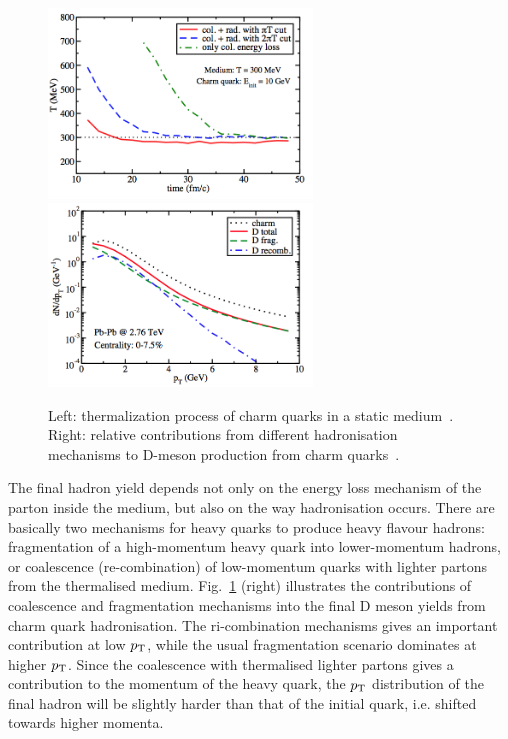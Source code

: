 \begin{figure}[!ht]
  \centering
  \includegraphics[width=7cm]{FigCap2/HFEnLoss3.png}
  \includegraphics[width=7cm]{FigCap2/FragHQ.png}
  \caption{Left: thermalization process of charm quarks in a static medium~\cite{Cao:2013ita}. Right: relative contributions from different hadronisation mechanisms to D-meson production from charm quarks~\cite{Cao:2013ita}.}
  \label{fig:HFEnLoss2}
\end{figure}
The final hadron yield depends not only on the energy loss mechanism of the parton inside the medium,
but also on the way hadronisation occurs. There are basically two mechanisms for heavy quarks 
to produce heavy flavour hadrons: fragmentation of a high-momentum heavy quark into lower-momentum
hadrons, or coalescence (re-combination) of low-momentum quarks with lighter partons from the thermalised
medium. Fig.~\ref{fig:HFEnLoss2} (right) illustrates the contributions of coalescence and fragmentation 
mechanisms into the final D meson yields from charm quark hadronisation. The ri-combination mechanisms
gives an important contribution at low $p_{\rm T}$, while the usual fragmentation scenario dominates at higher $p_{\rm T}$.
Since the coalescence with thermalised lighter partons gives a contribution to the momentum of the 
heavy quark, the $p_{\rm T}$ distribution of the final hadron will be slightly harder than that of the initial quark,
i.e. shifted towards higher momenta.\\

